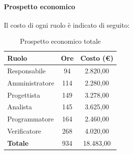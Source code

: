\documentclass[../PianoDiProgetto_v4.0.0.tex]{subfiles}
\begin{document}
			\newpage
			\paragraph{Prospetto economico}
			Il costo di ogni ruolo è indicato di seguito:
			\begin{table}[h]
				\centering
				\begin{tabular}{l * {2}{c}}
				\toprule
				\textbf{Ruolo} & \textbf{Ore} & \textbf{Costo (\euro{})} \\
				\midrule
				Responsabile & 94 & 2.820,00 \\
				Amministratore & 114 & 2.280,00 \\
				Progettista & 149 & 3.278,00 \\
				Analista & 145 & 3.625,00 \\		
				Programmatore & 164 & 2.460,00 \\		
				Verificatore & 268 & 4.020,00 \\				
				\midrule		
				\textbf{Totale} & 934 & 18.483,00 \\
				\bottomrule	
				\end{tabular}
				\caption{Prospetto economico totale}		
			\end{table}
			
\end{document}
